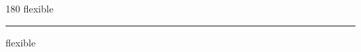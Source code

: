 
\begin{frame}
\begin{center}
\begin{turn}{180}
{\fontsize{2.5cm}{1em}\selectfont flexible}
\end{turn}
\vspace{1em}\par  
\hrule
\vspace{1em}\par  
{\fontsize{2.5cm}{1em}\selectfont flexible}
\end{center}
\end{frame}
